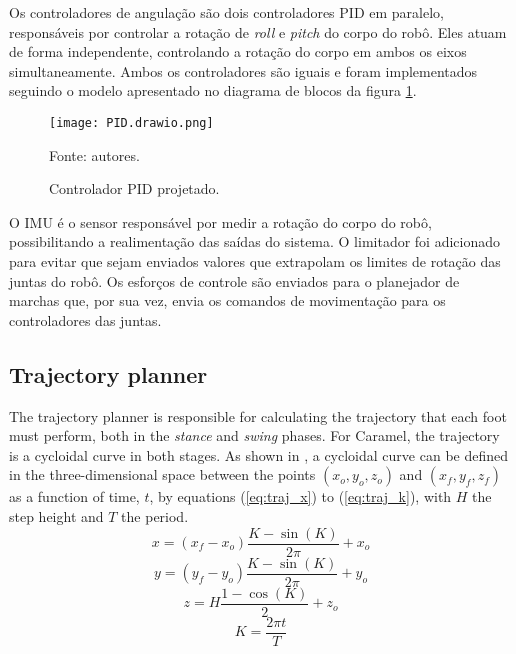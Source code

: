 \documentclass[conference]{IEEEtran}
\begin{document}
Os controladores de angulação são dois controladores PID em paralelo, responsáveis por controlar a rotação de \textit{roll} e \textit{pitch} do corpo do robô. Eles atuam de forma independente, controlando a rotação do corpo em ambos os eixos simultaneamente. Ambos os controladores são iguais e foram implementados seguindo o modelo apresentado no diagrama de blocos da figura \ref{fig:pid}.

\begin{figure}[htbp]
  \centering
  \texttt{[image: PID.drawio.png]}
  \caption{Controlador PID projetado.}
  Fonte: autores.
  \label{fig:pid}
\end{figure}

O IMU é o sensor responsável por medir a rotação do corpo do robô, possibilitando a realimentação das saídas do sistema. O limitador foi adicionado para evitar que sejam enviados valores que extrapolam os limites de rotação das juntas do robô. Os esforços de controle são enviados para o planejador de marchas que, por sua vez, envia os comandos de movimentação para os controladores das juntas.

\subsection{Trajectory planner}

The trajectory planner is responsible for calculating the trajectory that each foot must perform, both in the \textit{stance} and \textit{swing} phases. For Caramel, the trajectory is a cycloidal curve in both stages. As shown in \cite{Shi2021}, a cycloidal curve can be defined in the three-dimensional space between the points $(x_o, y_o, z_o)$ and $(x_f, y_f, z_f)$ as a function of time, $t$, by equations (\ref{eq:traj_x}) to (\ref{eq:traj_k}), with $H$ the step height and $T$ the period.
\begin{equation}
  x = (x_f - x_o) \frac{K - \sin{(K)}}{2 \pi} + x_o
  \label{eq:traj_x}
\end{equation}
\begin{equation}
  y = (y_f - y_o) \frac{K - \sin{(K)}}{2 \pi} + y_o
  \label{eq:traj_y}
\end{equation}
\begin{equation}
  z = H \frac{1 - \cos{(K)}}{2} + z_o
  \label{eq:traj_z}
\end{equation}
\begin{equation}
  K = \frac{2 \pi t}{T}
  \label{eq:traj_k}
\end{equation}
\end{document}
